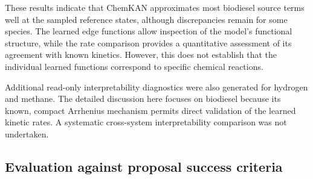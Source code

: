 \documentclass[11pt,a4paper]{article}
\begin{document}
These results indicate that ChemKAN approximates
most biodiesel source terms well at the sampled
reference states, although discrepancies remain
for some species. The learned edge functions
allow inspection of the model's functional
structure, while the rate comparison provides
a quantitative assessment of its agreement
with known kinetics. However, this does not
establish that the individual learned functions
correspond to specific chemical reactions.

Additional read-only interpretability diagnostics
were also generated for hydrogen and methane.
The detailed discussion here focuses on
biodiesel because its known, compact
Arrhenius mechanism permits direct validation
of the learned kinetic rates. A systematic
cross-system interpretability comparison was
not undertaken.



\subsection{Evaluation against proposal success criteria}
\end{document}
